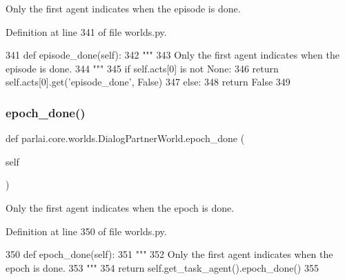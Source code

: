 \begin{DoxyVerb}Only the first agent indicates when the episode is done.
\end{DoxyVerb}
 

Definition at line 341 of file worlds.\+py.


\begin{DoxyCode}
341     \textcolor{keyword}{def }episode\_done(self):
342         \textcolor{stringliteral}{"""}
343 \textcolor{stringliteral}{        Only the first agent indicates when the episode is done.}
344 \textcolor{stringliteral}{        """}
345         \textcolor{keywordflow}{if} self.acts[0] \textcolor{keywordflow}{is} \textcolor{keywordflow}{not} \textcolor{keywordtype}{None}:
346             \textcolor{keywordflow}{return} self.acts[0].get(\textcolor{stringliteral}{'episode\_done'}, \textcolor{keyword}{False})
347         \textcolor{keywordflow}{else}:
348             \textcolor{keywordflow}{return} \textcolor{keyword}{False}
349 
\end{DoxyCode}
\mbox{\label{classparlai_1_1core_1_1worlds_1_1DialogPartnerWorld_a4cb1a886df2adc8e469d45652264da36}} 
\subsubsection{\texorpdfstring{epoch\+\_\+done()}{epoch\_done()}}
{\footnotesize\ttfamily def parlai.\+core.\+worlds.\+Dialog\+Partner\+World.\+epoch\+\_\+done (\begin{DoxyParamCaption}\item[{}]{self }\end{DoxyParamCaption})}

\begin{DoxyVerb}Only the first agent indicates when the epoch is done.
\end{DoxyVerb}
 

Definition at line 350 of file worlds.\+py.


\begin{DoxyCode}
350     \textcolor{keyword}{def }epoch\_done(self):
351         \textcolor{stringliteral}{"""}
352 \textcolor{stringliteral}{        Only the first agent indicates when the epoch is done.}
353 \textcolor{stringliteral}{        """}
354         \textcolor{keywordflow}{return} self.get\_task\_agent().epoch\_done()
355 
\end{DoxyCode}
\mbox{\label{classparlai_1_1core_1_1worlds_1_1DialogPartnerWorld_ac3a0c82c725967468208ec10022b6abe}} 
